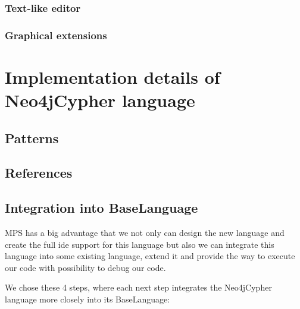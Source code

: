 \subsection{Text-like editor}

\subsection{Graphical extensions}


\chapter{Implementation details of Neo4jCypher language}

\section{Patterns}

\section{References}

\section{Integration into BaseLanguage}

MPS has a big advantage that we not only can design the new language and create the full ide
support for this language but also we can integrate this language into some existing language,
extend it and provide the way to execute our code with possibility to debug our code.

We chose these 4 steps, where each next step integrates the Neo4jCypher language more closely into
its BaseLanguage:

